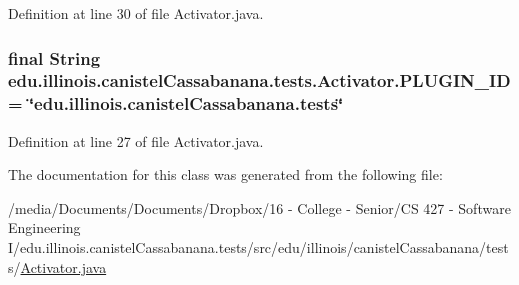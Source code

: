 Definition at line 30 of file Activator.java.

\hypertarget{classedu_1_1illinois_1_1canistelCassabanana_1_1tests_1_1Activator_a1beee14c19ce55e57da19ee01da99070}{
\subsubsection[{PLUGIN\_\-ID}]{\setlength{\rightskip}{0pt plus 5cm}final String {\bf edu.illinois.canistelCassabanana.tests.Activator.PLUGIN\_\-ID} = \char`\"{}edu.illinois.canistelCassabanana.tests\char`\"{}}}
\label{classedu_1_1illinois_1_1canistelCassabanana_1_1tests_1_1Activator_a1beee14c19ce55e57da19ee01da99070}


Definition at line 27 of file Activator.java.



The documentation for this class was generated from the following file:\begin{DoxyCompactItemize}
\item 
/media/Documents/Documents/Dropbox/16 -\/ College -\/ Senior/CS 427 -\/ Software Engineering I/edu.illinois.canistelCassabanana.tests/src/edu/illinois/canistelCassabanana/tests/\hyperlink{Activator_8java}{Activator.java}\end{DoxyCompactItemize}
